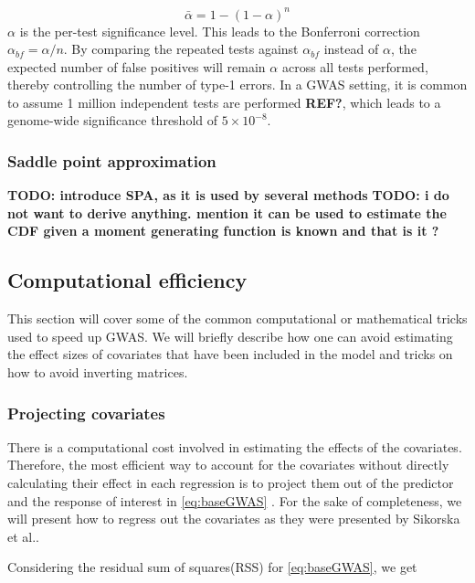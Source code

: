 \begin{equation} \label{eq:bonferroni}
\bar{\alpha} = 1 - (1-\alpha)^n 
\end{equation}
$ \alpha$ is the per-test significance level. This leads to the Bonferroni correction $ \alpha_{bf} =  \alpha/n $. By comparing the repeated tests against $ \alpha_{bf} $ instead of $ \alpha $, the expected number of false positives will remain $ \alpha $ across all tests performed, thereby controlling the number of type-1 errors. In a GWAS setting, it is common to assume 1 million independent tests are performed \textbf{REF?}, which leads to a genome-wide significance threshold of $ 5 \times 10^{-8} $.



\subsubsection{Saddle point approximation}
\textbf{TODO: introduce SPA, as it is used by several methods}
\textbf{TODO: i do not want to derive anything. mention it can be used to estimate the CDF given a moment generating function is known and that is it ?}



\subsection{Computational efficiency}
This section will cover some of the common computational or mathematical tricks used to speed up GWAS. We will briefly describe how 
one can avoid estimating the effect sizes of covariates that have been included in the model and tricks on how to avoid 
inverting matrices. 



\subsubsection{Projecting covariates}
There is a computational cost involved in estimating the effects of the covariates. Therefore, the most efficient way to account for 
the covariates without directly calculating their effect in each regression is to project them out of the predictor and the response 
of interest in \cref{eq:baseGWAS} \cite{sikorska2013gwas}. For the sake of completeness, we will present how to regress out the 
covariates as they were presented by Sikorska et al.\cite{sikorska2013gwas}. 

Considering the residual sum of squares(RSS) for \cref{eq:baseGWAS}, we get 

